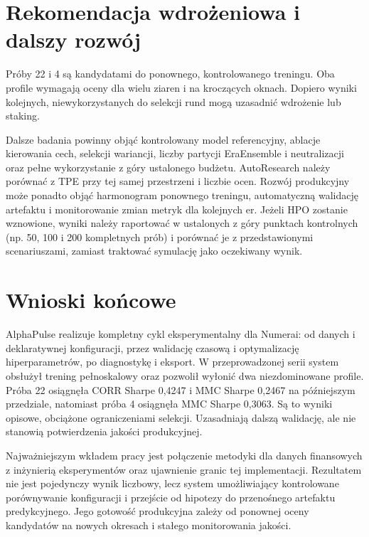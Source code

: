 \section{Rekomendacja wdrożeniowa i dalszy rozwój}
Próby 22 i 4 są kandydatami do ponownego, kontrolowanego treningu. Oba profile
wymagają oceny dla wielu ziaren i na kroczących oknach. Dopiero wyniki kolejnych,
niewykorzystanych do selekcji rund mogą uzasadnić wdrożenie lub staking.

Dalsze badania powinny objąć kontrolowany model referencyjny, ablacje kierowania cech,
selekcji wariancji, liczby partycji EraEnsemble i neutralizacji oraz pełne
wykorzystanie z góry ustalonego budżetu. AutoResearch należy porównać z TPE
przy tej samej przestrzeni i liczbie ocen. Rozwój produkcyjny może ponadto objąć
harmonogram ponownego treningu, automatyczną walidację artefaktu i monitorowanie
zmian metryk dla kolejnych er.
Jeżeli HPO zostanie wznowione, wyniki należy raportować w ustalonych z góry
punktach kontrolnych (np. 50, 100 i 200 kompletnych prób) i porównać je z
przedstawionymi scenariuszami, zamiast traktować symulację jako oczekiwany wynik.

\section{Wnioski końcowe}
AlphaPulse realizuje kompletny cykl eksperymentalny dla Numerai: od danych
i deklaratywnej konfiguracji, przez walidację czasową i optymalizację
hiperparametrów, po diagnostykę i eksport. W przeprowadzonej serii system obsłużył
trening pełnoskalowy oraz pozwolił wyłonić dwa niezdominowane profile. Próba 22
osiągnęła CORR Sharpe 0,4247 i MMC Sharpe 0,2467 na późniejszym przedziale,
natomiast próba 4 osiągnęła MMC Sharpe 0,3063. Są to wyniki opisowe, obciążone
ograniczeniami selekcji. Uzasadniają dalszą walidację, ale nie stanowią
potwierdzenia jakości produkcyjnej.

Najważniejszym wkładem pracy jest połączenie metodyki dla danych finansowych
z inżynierią eksperymentów oraz ujawnienie granic tej implementacji. Rezultatem
nie jest pojedynczy wynik liczbowy, lecz system umożliwiający kontrolowane
porównywanie konfiguracji i przejście od hipotezy do przenośnego artefaktu
predykcyjnego. Jego gotowość produkcyjna zależy od ponownej oceny kandydatów na
nowych okresach i stałego monitorowania jakości.
